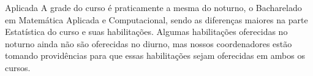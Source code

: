 \begin{subsecao}{Aplicada}
A grade do curso é praticamente a mesma do noturno, o Bacharelado em Matemática
Aplicada e Computacional, sendo as diferenças maiores na parte Estatística do
curso e suas habilitações. Algumas habilitações oferecidas no noturno ainda não
são oferecidas no diurno, mas nossos coordenadores estão tomando
providências para que essas habilitações sejam oferecidas em ambos os cursos.

\end{subsecao}
